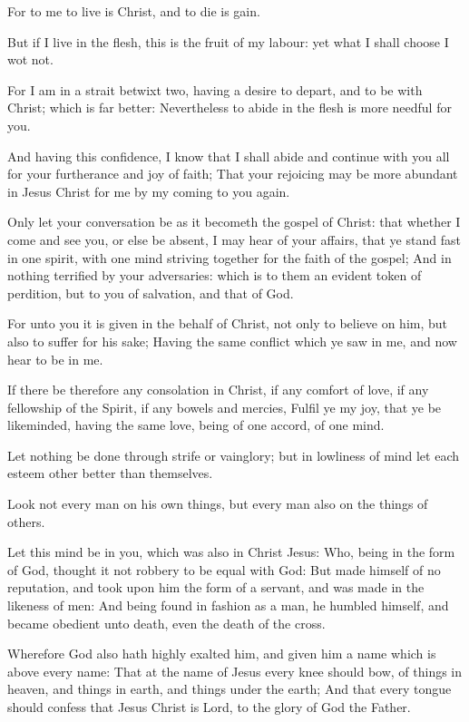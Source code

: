 \Verse For to me to live is Christ, and to die is gain.

\Verse But if I live in the flesh, this is the fruit of my labour: yet what I shall choose I wot not.

\Verse For I am in a strait betwixt two, having a desire to depart, and to be with Christ; which is far better: \Verse Nevertheless to abide in the flesh is more needful for you.

\Verse And having this confidence, I know that I shall abide and continue with you all for your furtherance and joy of faith; \Verse That your rejoicing may be more abundant in Jesus Christ for me by my coming to you again.

\Verse Only let your conversation be as it becometh the gospel of Christ: that whether I come and see you, or else be absent, I may hear of your affairs, that ye stand fast in one spirit, with one mind striving together for the faith of the gospel; \Verse And in nothing terrified by your adversaries: which is to them an evident token of perdition, but to you of salvation, and that of God.

\Verse For unto you it is given in the behalf of Christ, not only to believe on him, but also to suffer for his sake; \Verse Having the same conflict which ye saw in me, and now hear to be in me.


\Chapter
\Verse If there be therefore any consolation in Christ, if any comfort of love, if any fellowship of the Spirit, if any bowels and mercies, \Verse Fulfil ye my joy, that ye be likeminded, having the same love, being of one accord, of one mind.

\Verse Let nothing be done through strife or vainglory; but in lowliness of mind let each esteem other better than themselves.

\Verse Look not every man on his own things, but every man also on the things of others.

\Verse Let this mind be in you, which was also in Christ Jesus: \Verse Who, being in the form of God, thought it not robbery to be equal with God: \Verse But made himself of no reputation, and took upon him the form of a servant, and was made in the likeness of men: \Verse And being found in fashion as a man, he humbled himself, and became obedient unto death, even the death of the cross.

\Verse Wherefore God also hath highly exalted him, and given him a name which is above every name: \Verse That at the name of Jesus every knee should bow, of things in heaven, and things in earth, and things under the earth; \Verse And that every tongue should confess that Jesus Christ is Lord, to the glory of God the Father.


